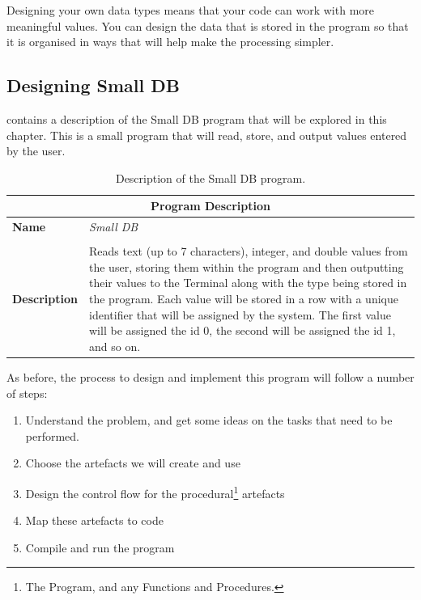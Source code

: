 Designing your own data types means that your code can work with more meaningful values. You can design the data that is stored in the program so that it is organised in ways that will help make the processing simpler.

\subsection{Designing Small DB} %
\label{sub:designing_small_db}

 contains a description of the Small DB program that will be explored in this chapter. This is a small program that will read, store, and output values entered by the user.

\begin{table}[h]
\centering
\begin{tabular}{l|p{10cm}}
  \hline
  \multicolumn{2}{c}{\textbf{Program Description}} \\
  \hline
  \textbf{Name} & \emph{Small DB} \\
  \\
  \textbf{Description} & Reads text (up to 7 characters), integer, and double values from the user, storing them within the program and then outputting their values to the Terminal along with the type being stored in the program. Each value will be stored in a row with a unique identifier that will be assigned by the system. The first value will be assigned the id 0, the second will be assigned the id 1, and so on.\\
  \hline
\end{tabular}
\caption{Description of the Small DB program.}
\label{tbl:small-db-prog}
\end{table}

As before, the process to design and implement this program will follow a number of steps:
\begin{enumerate}
  \item Understand the problem, and get some ideas on the tasks that need to be performed.
  \item Choose the artefacts we will create and use
  \item Design the control flow for the procedural\footnote{The Program, and any Functions and Procedures.} artefacts
  \item Map these artefacts to code
  \item Compile and run the program
\end{enumerate}

